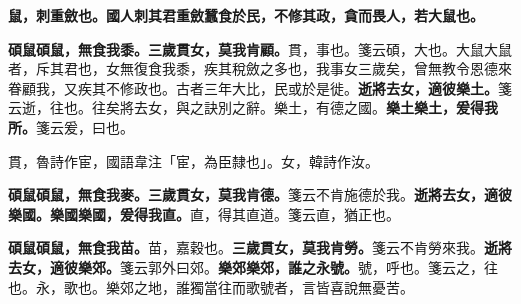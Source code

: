 
\textbf{鼠，刺重斂也。國人刺其君重斂蠶食於民，不修其政，貪而畏人，若大鼠也。}

\textbf{碩鼠碩鼠，無食我黍。三歲貫女，莫我肯顧。}{\footnotesize 貫，事也。箋云碩，大也。大鼠大鼠者，斥其君也，女無復食我黍，疾其稅斂之多也，我事女三歲矣，曾無教令恩德來眷顧我，又疾其不修政也。古者三年大比，民或於是徙。}\textbf{逝將去女，適彼樂土。}{\footnotesize 箋云逝，往也。往矣將去女，與之訣別之辭。樂土，有德之國。}\textbf{樂土樂土，爰得我所。}{\footnotesize 箋云爰，曰也。}

\begin{quoting}貫，魯詩作宦，國語韋注「宦，為臣隸也」。女，韓詩作汝。\end{quoting}

\textbf{碩鼠碩鼠，無食我麥。三歲貫女，莫我肯德。}{\footnotesize 箋云不肯施德於我。}\textbf{逝將去女，適彼樂國。樂國樂國，爰得我直。}{\footnotesize 直，得其直道。箋云直，猶正也。}

\textbf{碩鼠碩鼠，無食我苗。}{\footnotesize 苗，嘉穀也。}\textbf{三歲貫女，莫我肯勞。}{\footnotesize 箋云不肯勞來我。}\textbf{逝將去女，適彼樂郊。}{\footnotesize 箋云郭外曰郊。}\textbf{樂郊樂郊，誰之永號。}{\footnotesize 號，呼也。箋云之，往也。永，歌也。樂郊之地，誰獨當往而歌號者，言皆喜說無憂苦。}

